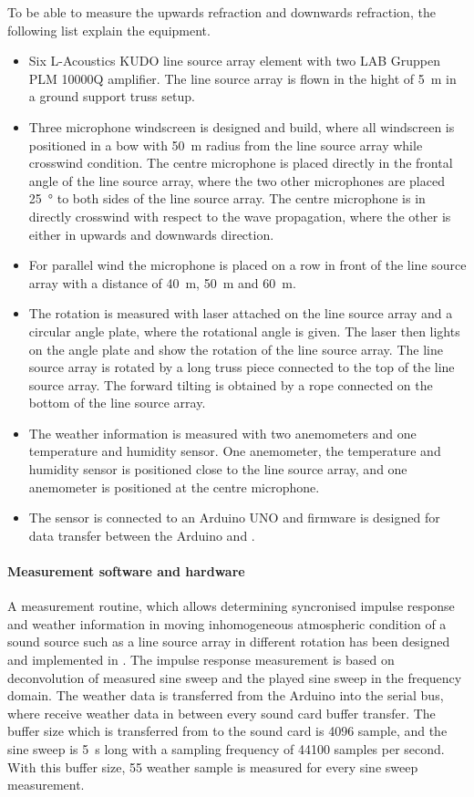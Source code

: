 To be able to measure the upwards refraction and downwards refraction, the following list explain the equipment.

\begin{itemize}
\item Six L-Acoustics KUDO line source array element with two LAB Gruppen PLM 10000Q amplifier. The line source array is flown in the hight of \SI{5}{\meter} in a ground support truss setup.
\item Three microphone windscreen is designed and build, where all windscreen is positioned in a bow with \SI{50}{\meter} radius from the line source array while crosswind condition. The centre microphone is placed directly in the frontal angle of the line source array, where the two other microphones are placed \SI{25}{\degree} to both sides of the line source array. The centre microphone is in directly crosswind with respect to the wave propagation, where the other is either in upwards and downwards direction.
\item For parallel wind the microphone is placed on a row in front of the line source array with a distance of \SI{40}{\meter}, \SI{50}{\meter} and \SI{60}{\meter}.
\item The rotation is measured with laser attached on the line source array and a circular angle plate, where the rotational angle is given. The laser then lights on the angle plate and show the rotation of the line source array. The line source array is rotated by a long truss piece connected to the top of the line source array. The forward tilting is obtained by a rope connected on the bottom of the line source array.
\item The weather information is measured with two anemometers and one temperature and humidity sensor. One anemometer, the temperature and humidity sensor is positioned close to the line source array, and one anemometer is positioned at the centre microphone. 
\item The sensor is connected to an Arduino UNO and firmware is designed for data transfer between the Arduino and \matlab .
\end{itemize}


\paragraph{Measurement software and hardware}
A measurement routine, which allows determining syncronised impulse response and weather information in moving inhomogeneous atmospheric condition of a sound source such as a line source array in different rotation has been designed and implemented in \matlab. The impulse response measurement is based on deconvolution of measured sine sweep and the played sine sweep in the frequency domain. The weather data is transferred from the Arduino into the serial bus, where \matlab receive weather data in between every sound card buffer transfer. The buffer size which is transferred from \matlab to the sound card is 4096 sample, and the sine sweep is \SI{5}{\second} long with a sampling frequency of 44100 samples per second. With this buffer size, 55 weather sample is measured for every sine sweep measurement. 



